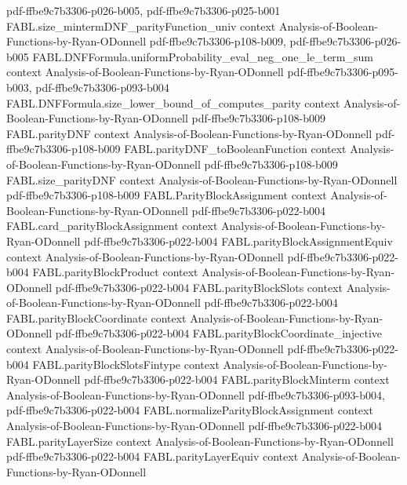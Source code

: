 \begin{theorem}
  {pdf-ffbe9c7b3306-p026-b005,
    pdf-ffbe9c7b3306-p025-b001}
\proofstep
  {FABL.size_mintermDNF_parityFunction_univ}
  {context}
  {Analysis-of-Boolean-Functions-by-Ryan-ODonnell}
  {pdf-ffbe9c7b3306-p108-b009,
    pdf-ffbe9c7b3306-p026-b005}
\proofstep
  {FABL.DNFFormula.uniformProbability_eval_neg_one_le_term_sum}
  {context}
  {Analysis-of-Boolean-Functions-by-Ryan-ODonnell}
  {pdf-ffbe9c7b3306-p095-b003,
    pdf-ffbe9c7b3306-p093-b004}
\proofstep
  {FABL.DNFFormula.size_lower_bound_of_computes_parity}
  {context}
  {Analysis-of-Boolean-Functions-by-Ryan-ODonnell}
  {pdf-ffbe9c7b3306-p108-b009}
\proofstep
  {FABL.parityDNF}
  {context}
  {Analysis-of-Boolean-Functions-by-Ryan-ODonnell}
  {pdf-ffbe9c7b3306-p108-b009}
\proofstep
  {FABL.parityDNF_toBooleanFunction}
  {context}
  {Analysis-of-Boolean-Functions-by-Ryan-ODonnell}
  {pdf-ffbe9c7b3306-p108-b009}
\proofstep
  {FABL.size_parityDNF}
  {context}
  {Analysis-of-Boolean-Functions-by-Ryan-ODonnell}
  {pdf-ffbe9c7b3306-p108-b009}
\proofstep
  {FABL.ParityBlockAssignment}
  {context}
  {Analysis-of-Boolean-Functions-by-Ryan-ODonnell}
  {pdf-ffbe9c7b3306-p022-b004}
\proofstep
  {FABL.card_parityBlockAssignment}
  {context}
  {Analysis-of-Boolean-Functions-by-Ryan-ODonnell}
  {pdf-ffbe9c7b3306-p022-b004}
\proofstep
  {FABL.parityBlockAssignmentEquiv}
  {context}
  {Analysis-of-Boolean-Functions-by-Ryan-ODonnell}
  {pdf-ffbe9c7b3306-p022-b004}
\proofstep
  {FABL.parityBlockProduct}
  {context}
  {Analysis-of-Boolean-Functions-by-Ryan-ODonnell}
  {pdf-ffbe9c7b3306-p022-b004}
\proofstep
  {FABL.parityBlockSlots}
  {context}
  {Analysis-of-Boolean-Functions-by-Ryan-ODonnell}
  {pdf-ffbe9c7b3306-p022-b004}
\proofstep
  {FABL.parityBlockCoordinate}
  {context}
  {Analysis-of-Boolean-Functions-by-Ryan-ODonnell}
  {pdf-ffbe9c7b3306-p022-b004}
\proofstep
  {FABL.parityBlockCoordinate_injective}
  {context}
  {Analysis-of-Boolean-Functions-by-Ryan-ODonnell}
  {pdf-ffbe9c7b3306-p022-b004}
\proofstep
  {FABL.parityBlockSlotsFintype}
  {context}
  {Analysis-of-Boolean-Functions-by-Ryan-ODonnell}
  {pdf-ffbe9c7b3306-p022-b004}
\proofstep
  {FABL.parityBlockMinterm}
  {context}
  {Analysis-of-Boolean-Functions-by-Ryan-ODonnell}
  {pdf-ffbe9c7b3306-p093-b004,
    pdf-ffbe9c7b3306-p022-b004}
\proofstep
  {FABL.normalizeParityBlockAssignment}
  {context}
  {Analysis-of-Boolean-Functions-by-Ryan-ODonnell}
  {pdf-ffbe9c7b3306-p022-b004}
\proofstep
  {FABL.parityLayerSize}
  {context}
  {Analysis-of-Boolean-Functions-by-Ryan-ODonnell}
  {pdf-ffbe9c7b3306-p022-b004}
\proofstep
  {FABL.parityLayerEquiv}
  {context}
  {Analysis-of-Boolean-Functions-by-Ryan-ODonnell}

\end{theorem}
